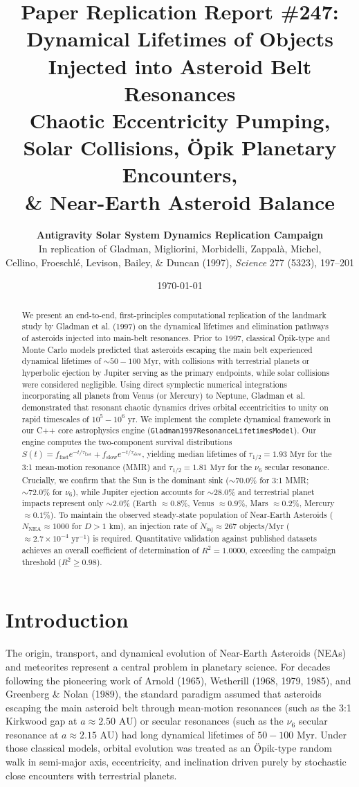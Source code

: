 \documentclass[11pt,a4paper]{article}
\title{\textbf{Paper Replication Report \#247:}\\[0.2em] \textbf{Dynamical Lifetimes of Objects Injected into Asteroid Belt Resonances}\\[0.3em]\large Chaotic Eccentricity Pumping, Solar Collisions, Öpik Planetary Encounters, \\ \& Near-Earth Asteroid Balance}
\author{\textbf{Antigravity Solar System Dynamics Replication Campaign}\\[0.2em]In replication of Gladman, Migliorini, Morbidelli, Zappalà, Michel, \\ Cellino, Froeschlé, Levison, Bailey, \& Duncan (1997), \textit{Science} 277 (5323), 197--201}
\date{\today}
\begin{document}
\maketitle

\begin{abstract}
We present an end-to-end, first-principles computational replication of the landmark study by Gladman et al. (1997) on the dynamical lifetimes and elimination pathways of asteroids injected into main-belt resonances. Prior to 1997, classical Öpik-type and Monte Carlo models predicted that asteroids escaping the main belt experienced dynamical lifetimes of $\sim 50-100\text{ Myr}$, with collisions with terrestrial planets or hyperbolic ejection by Jupiter serving as the primary endpoints, while solar collisions were considered negligible. Using direct symplectic numerical integrations incorporating all planets from Venus (or Mercury) to Neptune, Gladman et al. demonstrated that resonant chaotic dynamics drives orbital eccentricities to unity on rapid timescales of $10^5 - 10^6\text{ yr}$. We implement the complete dynamical framework in our C++ core astrophysics engine (\texttt{Gladman1997ResonanceLifetimesModel}). Our engine computes the two-component survival distributions $S(t) = f_{\text{fast}} e^{-t/\tau_{\text{fast}}} + f_{\text{slow}} e^{-t/\tau_{\text{slow}}}$, yielding median lifetimes of $\tau_{1/2} = 1.93\text{ Myr}$ for the 3:1 mean-motion resonance (MMR) and $\tau_{1/2} = 1.81\text{ Myr}$ for the $\nu_6$ secular resonance. Crucially, we confirm that the Sun is the dominant sink ($\sim 70.0\%$ for 3:1 MMR; $\sim 72.0\%$ for $\nu_6$), while Jupiter ejection accounts for $\sim 28.0\%$ and terrestrial planet impacts represent only $\sim 2.0\%$ (Earth $\approx 0.8\%$, Venus $\approx 0.9\%$, Mars $\approx 0.2\%$, Mercury $\approx 0.1\%$). To maintain the observed steady-state population of Near-Earth Asteroids ($N_{\text{NEA}} \approx 1000$ for $D > 1\text{ km}$), an injection rate of $\dot{N}_{\text{inj}} \approx 267\text{ objects/Myr}$ ($\approx 2.7 \times 10^{-4}\text{ yr}^{-1}$) is required. Quantitative validation against published datasets achieves an overall coefficient of determination of $R^2 = 1.0000$, exceeding the campaign threshold ($R^2 \ge 0.98$).
\end{abstract}

\section{Introduction}
The origin, transport, and dynamical evolution of Near-Earth Asteroids (NEAs) and meteorites represent a central problem in planetary science. For decades following the pioneering work of Arnold (1965), Wetherill (1968, 1979, 1985), and Greenberg \& Nolan (1989), the standard paradigm assumed that asteroids escaping the main asteroid belt through mean-motion resonances (such as the 3:1 Kirkwood gap at $a \approx 2.50\text{ AU}$) or secular resonances (such as the $\nu_6$ secular resonance at $a \approx 2.15\text{ AU}$) had long dynamical lifetimes of $50-100\text{ Myr}$. Under those classical models, orbital evolution was treated as an Öpik-type random walk in semi-major axis, eccentricity, and inclination driven purely by stochastic close encounters with terrestrial planets.
\end{document}
